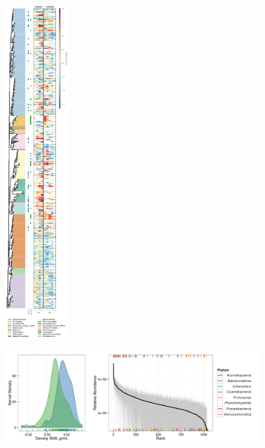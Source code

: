 \begin{figure}[H]
	\begin{center}
	\centerline{\includegraphics[width=0.25\textwidth]{figures/bacteria_tree/bacteria_tree.pdf}}
	\caption{\protect}\label{fig:trees}
        \end{center}
\end{figure}

\begin{figure}[H]
	\begin{center}
	\centerline{\includegraphics[width=\textwidth]{figures/shift_and_rabund2/shift_and_rabund.pdf}}
	\caption{\protect}\label{fig:shift}
        \end{center}
\end{figure}

